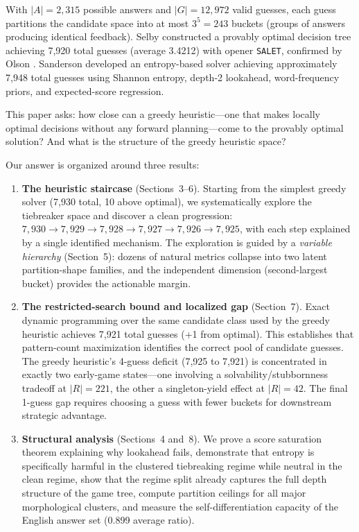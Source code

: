 \documentclass[11pt]{article}
\begin{document}
	With $|A| = 2{,}315$ possible answers and $|G| = 12{,}972$ valid guesses, each guess partitions the candidate space into at most $3^5 = 243$ buckets (groups of answers producing identical feedback). Selby \cite{selby2022} constructed a provably optimal decision tree achieving 7,920 total guesses (average 3.4212) with opener \texttt{SALET}, confirmed by Olson \cite{olson2022}.  Sanderson \cite{sanderson2022b} developed an entropy-based solver achieving approximately 7,948 total guesses using Shannon entropy, depth-2 lookahead, word-frequency priors, and expected-score regression.
	
	This paper asks: how close can a greedy heuristic---one that makes locally optimal decisions without any forward planning---come to the provably optimal solution?  And what is the structure of the greedy heuristic space?
	
	Our answer is organized around three results:
	
	\begin{enumerate}
		\item \textbf{The heuristic staircase} (Sections~3--6).  Starting from the simplest greedy solver (7,930 total, 10 above optimal), we systematically explore the tiebreaker space and discover a clean progression: $7{,}930 \to 7{,}929 \to 7{,}928 \to 7{,}927 \to 7{,}926 \to 7{,}925$, with each step explained by a single identified mechanism.  The exploration is guided by a \emph{variable hierarchy} (Section~5): dozens of natural metrics collapse into two latent partition-shape families, and the independent dimension (second-largest bucket) provides the actionable margin.
		
		\item \textbf{The restricted-search bound and localized gap} (Section~7).  Exact dynamic programming over the same candidate class used by the greedy heuristic achieves 7,921 total guesses (+1 from optimal).  This establishes that pattern-count maximization identifies the correct pool of candidate guesses.  The greedy heuristic's 4-guess deficit (7,925 to 7,921) is concentrated in exactly two early-game states---one involving a solvability/stubbornness tradeoff at $|R| = 221$, the other a singleton-yield effect at $|R| = 42$.  The final 1-guess gap requires choosing a guess with fewer buckets for downstream strategic advantage.
		
		\item \textbf{Structural analysis} (Sections~4 and~8).  We prove a score saturation theorem explaining why lookahead fails, demonstrate that entropy is specifically harmful in the clustered tiebreaking regime while neutral in the clean regime, show that the regime split already captures the full depth structure of the game tree, compute partition ceilings for all major morphological clusters, and measure the self-differentiation capacity of the English answer set (0.899 average ratio).
	\end{enumerate}
	
\end{document}
